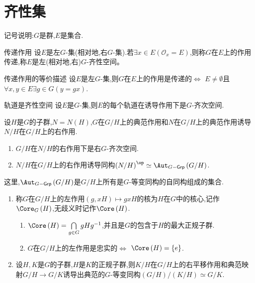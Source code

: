 \section{齐性集}

记号说明:$G$是群,$E$是集合.

\begin{definition}{传递作用}{}
	设$E$是左$G$-集(相对地,右$G$-集).若$\exists x\in E\left(\mathcal{O}_{x}=E\right)$,则称$G$在$E$上的作用传递,称$E$是左(相对地,右)$G$-齐性空间。
\end{definition}

\begin{proposition}{传递作用的等价描述}{}
	设$E$是左$G$-集,则$G$在$E$上的作用是传递的$\iff$ $E\neq\emptyset$且$\forall x,y\in E\exists g\in G\left(y=gx\right)$.
\end{proposition}

\begin{example}{轨道是齐性空间}{}
	设$E$是$G$-集,则$E$的每个轨道在诱导作用下是$G$-齐次空间.
\end{example}

\begin{proposition}{}{}
	设$H$是$G$的子群,$N=N\left(H\right)$,$G$在$G/H$上的典范作用和$N$在$G/H$上的典范作用诱导$N/H$在$G/H$上的右作用.
	\begin{enumerate}
		\item $G/H$在$N/H$的右作用下是右$G$-齐次空间.
		\item $N/H$在$G/H$上的右作用诱导同构$\left(N/H\right)^{\op}\simeq\Aut_{G-\mathsf{Grp}}\left(G/H\right)$.
	\end{enumerate}
	这里,$\Aut_{G-\mathsf{Grp}}\left(G/H\right)$是$G/H$上所有是$G$-等变同构的自同构组成的集合.
\end{proposition}

\begin{remark}{}{}
	\begin{enumerate}
		\item 称$G$在$G/H$上的左作用$\left(g,xH\right)\mapsto gxH$的核为$H$在$G$中的核心,记作$\Core_{G}\left(H\right)$,无歧义时记作$\Core\left(H\right)$.
		\begin{enumerate}
			\item $\Core\left(H\right)=\bigcap\limits_{g\in G}gHg^{-1}$,并且是$G$的包含于$H$的最大正规子群.
			\item $G$在$G/H$上的左作用是忠实的$\iff$ $\Core\left(H\right)=\left\{e\right\}$.
		\end{enumerate}
		\item 设$H,K$是$G$的子群,$H$是$K$的正规子群,则$K/H$在$G/H$上的右平移作用和典范映射$G/H\to G/K$诱导出典范的$G$-等变同构$\left(G/H\right)/\left(K/H\right)\simeq G/K$.
	\end{enumerate}
\end{remark}

